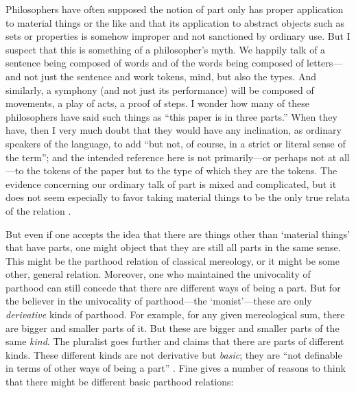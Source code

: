 \documentclass[11pt]{article}
\newenvironment{squote}{%
\begin{spacing}{1}
       	\begin{list}{}{%
\setlength{\labelwidth}{0pt}%
\rightmargin\leftmargin%
}
\item\relax
}{%
\end{list}%
\end{spacing}
}
\begin{document}
\begin{spacing}{1.25}
\begin{squote}
Philosophers have often supposed the notion of part only has proper
application to material things or the like and that its application
to abstract objects such as sets or properties is somehow improper
and not sanctioned by ordinary use.  But I suspect that this is
something of a philosopher’s myth.  We happily talk of a sentence
being composed of words and of the words being composed of
letters---and not just the sentence and work tokens, mind, but also
the types.  And similarly, a symphony (and not just its performance)
will be composed of movements, a play of acts, a proof of steps.  I
wonder how many of these philosophers have said such things as ``this
paper is in three parts.''  When they have, then I very much doubt
that they would have any inclination, as ordinary speakers of the
language, to add ``but not, of course, in a strict or literal sense of
the term''; and the intended reference here is not primarily---or
perhaps not at all---to the tokens of the paper but to the type of
which they are the tokens.  The evidence concerning our ordinary talk
of part is mixed and complicated, but it does not seem especially to
favor taking material things to be the only true relata of the
relation \citeyearpar[561]{fine2010}.
\end{squote}

But even if one accepts the idea that there are things other than
`material things' that have parts, one might object that they are
still all parts in the same sense.  This might be the parthood
relation of classical mereology, or it might be some other, general
relation.  Moreover, one who maintained the univocality of parthood
can still concede that there are different ways of being a part.  But
for the believer in the univocality of parthood---the `monist'---these
are only {\em derivative} kinds of parthood.  For example, for any
given mereological sum, there are bigger and smaller parts of it. But
these are bigger and smaller parts of the same {\em kind}.  The
pluralist goes further and claims that there are parts of different
kinds. These different kinds are not derivative but \emph{basic}; they
are ``not definable in terms of other ways of being a part''
\citep[561]{fine2010}.  Fine gives a number of reasons to think that
there might be different basic parthood relations:


\end{spacing}
\end{document}
